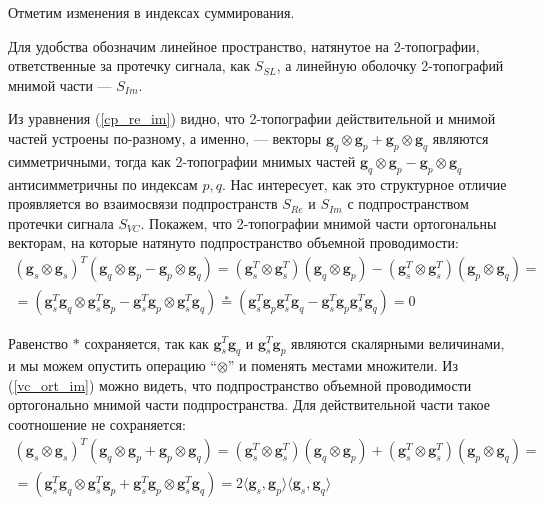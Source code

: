 Отметим изменения в индексах суммирования.

Для удобства обозначим линейное пространство, натянутое на 2-топографии, ответственные за протечку сигнала, как
$S_{SL}$, а линейную оболочку 2-топографий мнимой части --- $S_{Im}$.

Из уравнения (\ref{cp_re_im}) видно, что 2-топографии действительной и мнимой частей устроены по-разному,
а именно, --- векторы $\mathbf{g}_q \otimes \mathbf{g}_p + \mathbf{g}_p \otimes \mathbf{g}_q$ являются симметричными,
тогда как 2-топографии мнимых частей $\mathbf{g}_q \otimes \mathbf{g}_p - \mathbf{g}_p \otimes \mathbf{g}_q$
антисимметричны по индексам $p, q$.
Нас интересует, как это структурное отличие проявляется во взаимосвязи подпространств $S_{Re}$ и $S_{Im}$ с
подпространством протечки сигнала $S_{VC}$.
Покажем, что  2-топографии мнимой части ортогональны векторам, на которые натянуто подпространство объемной проводимости:
\begin{gather}
    (\mathbf{g}_s \otimes \mathbf{g}_s)^T(\mathbf{g}_q \otimes \mathbf{g}_p - \mathbf{g}_p \otimes \mathbf{g}_q) =
        (\mathbf{g}_s^T \otimes \mathbf{g}_s^T)(\mathbf{g}_q \otimes \mathbf{g}_p) -
        (\mathbf{g}_s^T \otimes \mathbf{g}_s^T)(\mathbf{g}_p \otimes \mathbf{g}_q) = \nonumber \\
       =(\mathbf{g}_s^T \mathbf{g}_q \otimes \mathbf{g}_s^T \mathbf{g}_p -
         \mathbf{g}_s^T \mathbf{g}_p \otimes \mathbf{g}_s^T \mathbf{g}_q) \stackrel{*}{=}
        (\mathbf{g}_s^T \mathbf{g}_p \mathbf{g}_s^T \mathbf{g}_q -
         \mathbf{g}_s^T \mathbf{g}_p \mathbf{g}_s^T \mathbf{g}_q) = 0
         \label{vc_ort_im}
\end{gather}

Равенство $*$ сохраняется, так как $\mathbf{g}^T_s \mathbf{g}_q$ и $\mathbf{g}_s^T \mathbf{g}_p$ являются скалярными величинами,
и мы можем опустить операцию ``$\otimes$'' и поменять местами множители.
Из (\ref{vc_ort_im}) можно видеть,
что подпространство объемной проводимости ортогонально мнимой части подпространства.
Для действительной части такое соотношение не сохраняется:
\begin{gather}
    (\mathbf{g}_s \otimes \mathbf{g}_s)^T(\mathbf{g}_q \otimes \mathbf{g}_p + \mathbf{g}_p \otimes \mathbf{g}_q) =
        (\mathbf{g}_s^T \otimes \mathbf{g}_s^T)(\mathbf{g}_q \otimes \mathbf{g}_p) +
        (\mathbf{g}_s^T \otimes \mathbf{g}_s^T)(\mathbf{g}_p \otimes \mathbf{g}_q) = \nonumber \\
       =(\mathbf{g}_s^T \mathbf{g}_q \otimes \mathbf{g}_s^T \mathbf{g}_p +
         \mathbf{g}_s^T \mathbf{g}_p \otimes \mathbf{g}_s^T \mathbf{g}_q) =
        2\langle\mathbf{g}_s, \mathbf{g}_p\rangle \langle\mathbf{g}_s, \mathbf{g}_q\rangle
         \label{vc_ort_re}
\end{gather}

